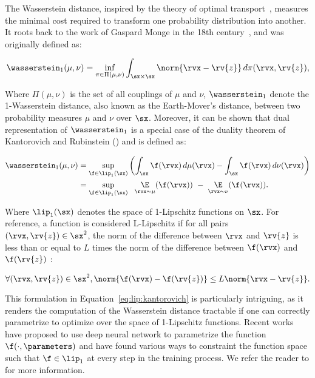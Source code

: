 The Wasserstein distance, inspired by the theory of optimal transport~\cite{villani2009optimal}, measures the minimal cost required to transform one probability distribution into another. It roots back to the work of Gaspard Monge in the 18th century~\cite{monge1781memoire}, and was originally defined as:

\begin{equation}
    \wasserstein_1(\mu, \nu) = \inf_{\pi \in \Pi(\mu, \nu)} \int_{\sx \times \sx} \norm{\rvx - \rv{z}} \,d\pi(\rvx, \rv{z}),
\end{equation}

Where $\Pi(\mu, \nu)$ is the set of all couplings of $\mu$ and $\nu$, $\wasserstein_1$ denote the 1-Wasserstein distance, also known as the Earth-Mover's distance, between two probability measures $\mu$ and $\nu$ over $\sx$.
Moreover, it can be shown that dual representation of $\wasserstein_1$ is a special case of the duality theorem of Kantorovich and Rubinstein (\cite{kantorovich1960mathematical}) and is defined as:

\begin{align}\label{eq:lip:kantorovich}
    \wasserstein_1(\mu, \nu) &= \sup_{\f \in \lip_1(\sx)} \left( \int_{\sx} \f(\rvx) \,d\mu(\rvx) - \int_{\sx} \f(\rvx) \,d\nu(\rvx) \right) \\
    & = \sup_{\f \in \lip_1(\sx)} ~ ~ \underset{\rvx \sim \mu}{\E}(\f(\rvx)) ~ - ~ \underset{\rvx \sim \nu}{\E}(\f(\rvx)).
\end{align}

Where $\lip_1(\sx)$ denotes the space of 1-Lipschitz functions on $\sx$. For reference, a function is considered L-Lipschitz if for all pairs $(\rvx, \rv{z}) \in \sx^2$, the norm of the difference between $\rvx$ and $\rv{z}$ is less than or equal to $L$ times the norm of the difference between $\f(\rvx)$ and $\f(\rv{z})$ :

$$
\forall (\rvx, \rv{z}) \in \sx^2, \norm{\f(\rvx) - \f(\rv{z})} \leq L \norm{\rvx - \rv{z}}.
$$

This formulation in Equation~\ref{eq:lip:kantorovich} is particularly intriguing, as it renders the computation of the Wasserstein distance tractable if one can correctly parametrize to optimize over the space of 1-Lipschitz functions.
Recent works have proposed to use deep neural network to parametrize the function $\f(\cdot, \parameters)$ and have found various ways to constraint the function space such that $\f \in \lip_1$ at every step in the training process. We refer the reader to \cite{serrurier2022adversarial,hein_formal_2017,Sokolic_2017,tsipras2018robustness,salimans2016weight,miyato2018spectral} for more information.

